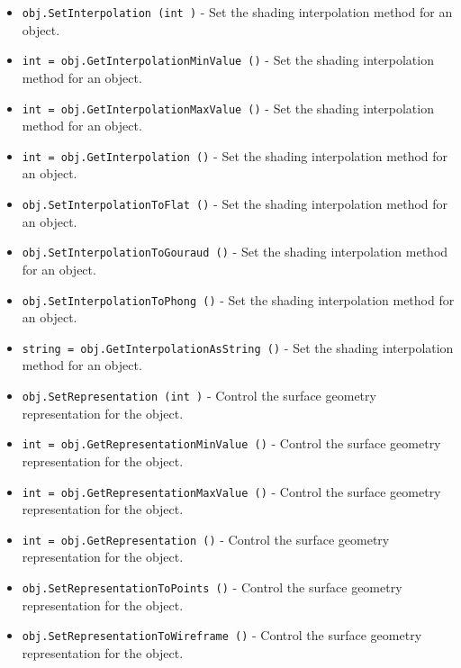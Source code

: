 \begin{itemize}
\item  \verb|obj.SetInterpolation (int )| -  Set the shading interpolation method for an object.

\item  \verb|int = obj.GetInterpolationMinValue ()| -  Set the shading interpolation method for an object.

\item  \verb|int = obj.GetInterpolationMaxValue ()| -  Set the shading interpolation method for an object.

\item  \verb|int = obj.GetInterpolation ()| -  Set the shading interpolation method for an object.

\item  \verb|obj.SetInterpolationToFlat ()| -  Set the shading interpolation method for an object.

\item  \verb|obj.SetInterpolationToGouraud ()| -  Set the shading interpolation method for an object.

\item  \verb|obj.SetInterpolationToPhong ()| -  Set the shading interpolation method for an object.

\item  \verb|string = obj.GetInterpolationAsString ()| -  Set the shading interpolation method for an object.

\item  \verb|obj.SetRepresentation (int )| -  Control the surface geometry representation for the object.

\item  \verb|int = obj.GetRepresentationMinValue ()| -  Control the surface geometry representation for the object.

\item  \verb|int = obj.GetRepresentationMaxValue ()| -  Control the surface geometry representation for the object.

\item  \verb|int = obj.GetRepresentation ()| -  Control the surface geometry representation for the object.

\item  \verb|obj.SetRepresentationToPoints ()| -  Control the surface geometry representation for the object.

\item  \verb|obj.SetRepresentationToWireframe ()| -  Control the surface geometry representation for the object.


\end{itemize}
